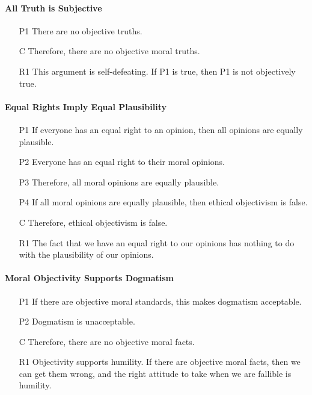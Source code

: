 \documentclass[12pt]{article}
\begin{document}
\paragraph{All Truth is Subjective}
\begin{itemize}
    \item [P1] There are no objective truths.
    \item [C] Therefore, there are no objective moral truths.
    \item [R1] This argument is self-defeating. If P1 is true, then P1 is not objectively true.
\end{itemize}

\paragraph{Equal Rights Imply Equal Plausibility}
\begin{itemize}
    \item [P1] If everyone has an equal right to an opinion, then all opinions are equally plausible.
    \item [P2] Everyone has an equal right to their moral opinions.
    \item [P3] Therefore, all moral opinions are equally plausible.
    \item [P4] If all moral opinions are equally plausible, then ethical objectivism is false.
    \item [C] Therefore, ethical objectivism is false.
    \item [R1] The fact that we have an equal right to our opinions has nothing to do with the plausibility of our opinions.
\end{itemize}

\paragraph{Moral Objectivity Supports Dogmatism}
\begin{itemize}
    \item [P1] If there are objective moral standards, this makes dogmatism acceptable.
    \item [P2] Dogmatism is unacceptable.
    \item [C] Therefore, there are no objective moral facts.
    \item [R1] Objectivity supports humility. If there are objective moral facts, then we can get them wrong, and the right attitude to take when we are fallible is humility.
\end{itemize}
\end{document}
